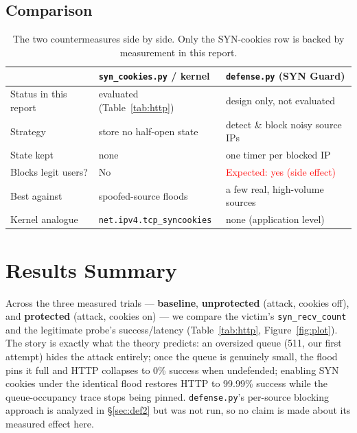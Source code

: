\documentclass[11pt,a4paper]{article}
\begin{document}
\subsection{Comparison}
\begin{table}[H]
\centering
\caption{The two countermeasures side by side. Only the SYN-cookies row is backed by measurement in this report.}
\begin{tabular}{@{}lll@{}}
\toprule
 & \textbf{\texttt{syn\_cookies.py} / kernel} & \textbf{\texttt{defense.py} (SYN Guard)} \\ \midrule
Status in this report & evaluated (Table~\ref{tab:http}) & design only, not evaluated \\
Strategy        & store no half-open state            & detect \& block noisy source IPs \\
State kept      & none                                 & one timer per blocked IP \\
Blocks legit users? & No                               & \textcolor{red}{Expected: yes (side effect)} \\
Best against    & spoofed-source floods                & a few real, high-volume sources \\
Kernel analogue & \texttt{net.ipv4.tcp\_syncookies}    & none (application level) \\ \bottomrule
\end{tabular}
\end{table}

\section{Results Summary}
\label{sec:results}
Across the three measured trials --- \textbf{baseline}, \textbf{unprotected}
(attack, cookies off), and \textbf{protected} (attack, cookies on) --- we
compare the victim's \texttt{syn\_recv\_count} and the legitimate probe's
success/latency (Table~\ref{tab:http}, Figure~\ref{fig:plot}). The story is
exactly what the theory predicts: an oversized queue (511, our first attempt)
hides the attack entirely; once the queue is genuinely small, the flood pins
it full and HTTP collapses to 0\% success when undefended; enabling SYN
cookies under the identical flood restores HTTP to 99.99\% success while the
queue-occupancy trace stops being pinned. \texttt{defense.py}'s per-source
blocking approach is analyzed in \S\ref{sec:def2} but was not run, so no
claim is made about its measured effect here.
\end{document}
